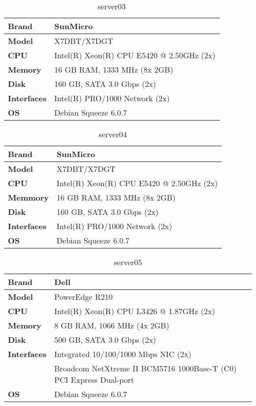 \documentclass[Configuration]{subfiles}
\begin{document}
\begin{table}[H]
\caption{server03}
\centering
\begin{tabular}{|p{2cm}|p{9cm}|}
\hline
\textbf{Brand} & SunMicro \\ \hline
\textbf{Model} & X7DBT/X7DGT \\ \hline
\textbf{CPU} & Intel(R) Xeon(R) CPU E5420 @ 2.50GHz (2x)\\ \hline
\textbf{Memory} & 16 GB RAM, 1333 MHz (8x 2GB) \\ \hline
\textbf{Disk} & 160 GB, SATA 3.0 Gbps (2x)\\ \hline
\textbf{Interfaces} &   Intel(R) PRO/1000 Network (2x) \\ \hline
\textbf{OS} & Debian Squeeze 6.0.7 \\ \hline
\end{tabular}
\end{table}

\begin{table}[H]
\caption{server04}
\centering
\begin{tabular}{|p{2cm}|p{9cm}|}
\hline
\textbf{Brand} & SunMicro \\ \hline
\textbf{Model} & X7DBT/X7DGT \\ \hline
\textbf{CPU} & Intel(R) Xeon(R) CPU E5420 @ 2.50GHz (2x)\\ \hline
\textbf{Memmory} & 16 GB RAM, 1333 MHz (8x 2GB) \\ \hline
\textbf{Disk} & 160 GB, SATA 3.0 Gbps (2x)\\ \hline
\textbf{Interfaces} &   Intel(R) PRO/1000 Network (2x) \\ \hline
\textbf{OS} & Debian Squeeze 6.0.7 \\ \hline
\end{tabular}
\end{table}

\begin{table}[H]
\caption{server05}
\centering
\begin{tabular}{|p{2cm}|p{9cm}|}
\hline
\textbf{Brand} & Dell \\ \hline
\textbf{Model} & PowerEdge R210 \\ \hline
\textbf{CPU} & Intel(R) Xeon(R) CPU L3426 @ 1.87GHz (2x)\\ \hline
\textbf{Memory} & 8 GB RAM, 1066 MHz (4x 2GB) \\ \hline
\textbf{Disk} & 500 GB, SATA 3.0 Gbps (2x)\\ \hline
\textbf{Interfaces} &  Integrated 10/100/1000 Mbps NIC (2x) \\ \hline
 & Broadcom NetXtreme II BCM5716 1000Base-T (C0) PCI Express Dual-port \\ \hline
\textbf{OS} & Debian Squeeze 6.0.7 \\ \hline
\end{tabular}
\end{table}
\end{document}
